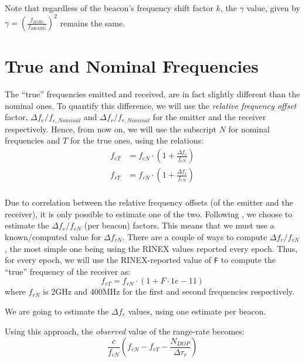 Note that regardless of the beacon's frequency shift factor $k$, the $\gamma$ 
value, given by $\gamma = \left( \frac{f_{2GHz}}{f_{400MHz}} \right) ^2$ remains 
the same.

\section{True and Nominal Frequencies}
\label{sec:true-nominal-frequencies}
The ``true'' frequencies emitted and received, are in fact slightly different 
than the nominal ones. To quantify this difference, we will use the 
\emph{relative frequency offset} factor, $\Delta f_e / f_{e,Nominal}$ and 
$\Delta f_r / f_{r,Nominal}$ for the emitter and the receiver respectively. 
Hence, from now on, we will use the subscript $N$ for nominal frequencies and 
$T$ for the true ones, using the relations:
\begin{equation}
  \begin{aligned}
    f_{eT} &= f_{eN} \cdot \left( 1 + \frac{\Delta f_e}{f_{eN}} \right) \\
    f_{rT} &= f_{rN} \cdot \left( 1 + \frac{\Delta f_r}{f_{rN}} \right) \\
  \end{aligned}
\end{equation}

Due to correlation between the relative frequency offsets (of the emitter and 
the receiver), it is only possible to estimate one of the two. Following 
\cite{lemoine-2016}, we choose to estimate the $\Delta f_e / f_{eN}$ (per beacon) 
factors. This means that we must use a known/computed value for $\Delta f_{rN}$. 
{\color{brown}There are a couple of ways to compute $\Delta f_r / f_{rN}$, 
the most simple one being using the RINEX values reported every epoch.}
Thus, for every epoch, we will use the RINEX-reported value of \texttt{F} to 
compute the ``true'' frequency of the receiver as:
\begin{equation}
  f_{rT} = f_{rN} \cdot \left( 1 + F \cdot 1e-11 \right)
\end{equation}
where $f_{rN}$ is 2GHz and 400MHz for the first and second frequencies 
respectively.

We are going to estimate the $\Delta f_e$ values, using one estimate per beacon.

Using this approach, the \emph{observed} value of the range-rate becomes:
\begin{equation}
  \frac{c}{f_{eN}} \left( f_{eN} - f_{rT} - \frac{N_{DOP}}{\Delta \tau_{r}} \right) 
\end{equation}

